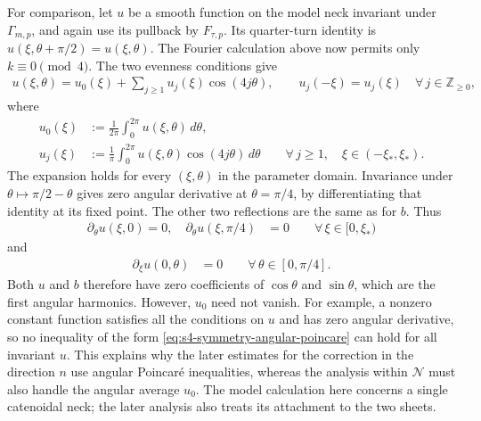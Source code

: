 \documentclass[a4paper,11pt,oneside,reqno]{amsart}
\numberwithin{equation}{section}
\theoremstyle{definition}
\begin{document}
For comparison, let $u$ be a smooth function on the
model neck invariant under $\Gamma_{m,p}$, and again use its pullback by
$F_{\tau,p}$. Its quarter-turn identity is
$u(\xi,\theta+\pi/2)=u(\xi,\theta)$.
The Fourier calculation above now permits only
$k\equiv0\pmod4$. The two evenness conditions give
%
\begin{align*}
    u(\xi,\theta)
    =u_0(\xi)+\sum_{j\geq1}u_j(\xi)\cos(4j\theta),
    \qquad
    u_j(-\xi)=u_j(\xi)
    \quad\forall\,j\in\mathbb Z_{\geq0},
\end{align*}
%
where
%
\begin{align*}
    u_0(\xi)&:=\frac1{2\pi}\int_0^{2\pi}u(\xi,\theta)\,d\theta,\\
    u_j(\xi)&:=\frac1\pi\int_0^{2\pi}
    u(\xi,\theta)\cos(4j\theta)\,d\theta
    \qquad\forall\,j\geq1,\quad \xi\in(-\xi_*,\xi_*).
\end{align*}
%
The expansion holds for every $(\xi,\theta)$ in the
parameter domain.
Invariance under $\theta\mapsto\pi/2-\theta$ gives
zero angular derivative at $\theta=\pi/4$, by
differentiating that identity at its fixed point.
The other two reflections are the same as for $b$.
Thus
%
\begin{align*}
    \partial_\theta u(\xi,0)=0, \quad \partial_\theta u(\xi,\pi/4)&=0 \qquad\forall\,\xi\in[0,\xi_*)
\end{align*}
%
and
%
\begin{align*}
    \partial_\xi u(0,\theta)&=0 \qquad\forall\,\theta\in[0,\pi/4].
\end{align*}
%
Both $u$ and $b$ therefore have zero coefficients of
$\cos\theta$ and $\sin\theta$, which are the first
angular harmonics. However, $u_0$ need not vanish.
For example, a nonzero constant function satisfies
all the conditions on $u$ and has zero angular derivative,
so no inequality of the form
\eqref{eq:s4-symmetry-angular-poincare} can hold for all
invariant $u$.
This explains why the later estimates for the correction
in the direction $n$ use angular Poincar\'e inequalities,
whereas the analysis within $\mathcal N$ must also handle
the angular average $u_0$. The model calculation here
concerns a single catenoidal neck; the later analysis
also treats its attachment to the two sheets.
\end{document}
